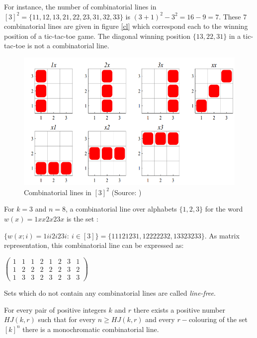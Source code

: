 For instance, the number of combinatorial lines in $[3]^2=\{11,12,13,21,22,23,31,32,33\}$ is $(3+1)^2-3^2=16-9=7.$ These 7 combinatorial lines are given in figure \eqref{cl} which correspond each to the winning position of a tic-tac-toe game. The diagonal winning position $\{13, 22,31\}$ in a tic-tac-toe is not a combinatorial line.
\begin{figure}[hbtp]
\centering
\includegraphics[scale=0.35]{cblines.png}
\caption{Combinatorial lines in $[3]^2$ (Source: \cite{polymath2010density})} \label{cl}
\end{figure}

For $k=3$ and $n=8$, a combinatorial line over alphabets $\{1,2,3\}$ for the word  $w(x)=1xx2x23x$ is the set :

$\{w(x;i)=1ii2i23i: \ i\in [3]\}=  \{11121231, 12222232, 13323233 \}.$ As matrix representation, this combinatorial line can be expressed as:

\begin{center}
$\left(\begin{array}{cccccccc}
1 & 1 & 1 & 2 & 1 & 2& 3 &1\\  1 & 2 & 2 & 2 & 2 & 2 & 3 & 2\\ 1 & 3 & 3 & 2 & 3 & 2 & 3 & 3 
\end{array}  \right)$
\end{center}


Sets which do not contain any combinatorial lines are called  \textit{line-free}. 

\begin{thm}   For every pair of positive integers $k$ and $r$ there exists a positive number $HJ(k, r)$ such that for every $n \geq HJ(k, r)$ and every $r-$colouring of the set $[k]^n$ there is a
monochromatic combinatorial line.   \label{hj1} 	\end{thm}

